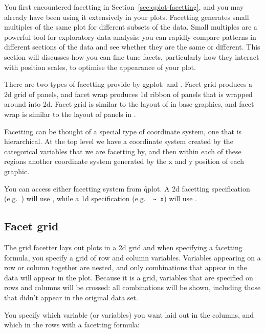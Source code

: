 You first encountered facetting in Section~\ref{sec:qplot-facetting}, and you may already have been using it extensively in your plots.  Facetting generates small multiples of the same plot for different subsets of the data.  Small multiples are a powerful tool for exploratory data analysis: you can rapidly compare patterns in different sections of the data and see whether they are the same or different.  This section will discusses how you can fine tune facets, particularly how they interact with position scales, to optimise the appearance of your plot. 

There are two types of facetting provide by ggplot:  and .  Facet grid produces a 2d grid of panels, and facet wrap produces 1d ribbon of panels that is wrapped around into 2d.  Facet grid is similar to the layout of  in base graphics, and facet wrap is similar to the layout of panels in .

Facetting can be thought of a special type of coordinate system, one that is hierarchical.  At the top level we have a coordinate system created by the categorical variables that we are facetting by, and then within each of these regions another coordinate system generated by the x and y position of each graphic.

You can access either facetting system from \f{qplot}. A 2d facetting specification (e.g.\ ) will use , while a 1d specification (e.g.\ \verb| ~ x|) will use .

\subsection{Facet grid}

The grid facetter lays out plots in a 2d grid and when specifying a facetting formula, you specify a grid of row and column variables. Variables appearing on a row or column together are nested, and only combinations that appear in the data will appear in the plot. Because it is a grid, variables that are specified on rows and columns will be crossed: all combinations will be shown, including those that didn't appear in the original data set.

You specify which variable (or variables) you want laid out in the columns, and which in the rows with a facetting formula:

